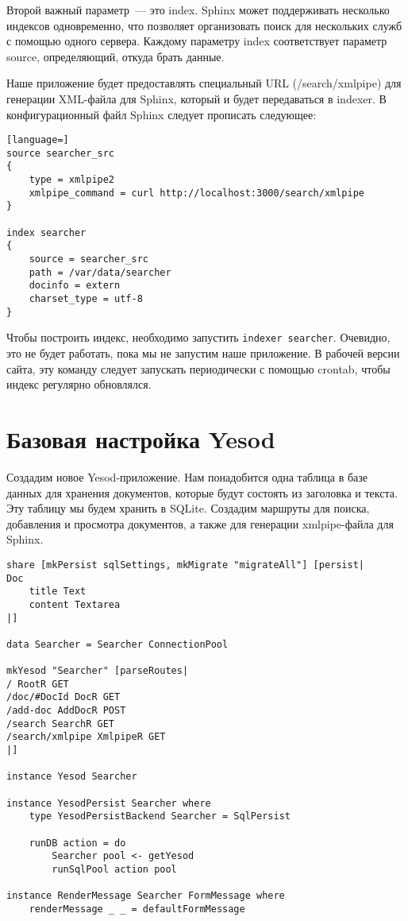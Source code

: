 Второй важный параметр~--- это index. Sphinx может поддерживать несколько индексов одновременно, что позволяет организовать поиск для нескольких служб с помощью одного сервера. Каждому параметру index соответствует параметр source, определяющий, откуда брать данные.

Наше приложение будет предоставлять специальный URL (/search/xmlpipe) для генерации XML-файла для Sphinx, который и будет передаваться в indexer. В конфигурационный файл Sphinx следует прописать следующее:
\begin{lstlisting}[language=]
source searcher_src
{
    type = xmlpipe2
    xmlpipe_command = curl http://localhost:3000/search/xmlpipe
}

index searcher
{
    source = searcher_src
    path = /var/data/searcher
    docinfo = extern
    charset_type = utf-8
}
\end{lstlisting}

Чтобы построить индекс, необходимо запустить \lstinline!indexer searcher!. Очевидно, это не будет работать, пока мы не запустим наше приложение. В рабочей версии сайта, эту команду следует запускать периодически с помощью crontab, чтобы индекс регулярно обновлялся.

\section{Базовая настройка Yesod}
Создадим новое Yesod-приложение. Нам понадобится одна таблица в базе данных для хранения документов, которые будут состоять из заголовка и текста. Эту таблицу мы будем хранить в SQLite. Создадим маршруты для поиска, добавления и просмотра документов, а также для генерации xmlpipe-файла для Sphinx.
\begin{lstlisting}
share [mkPersist sqlSettings, mkMigrate "migrateAll"] [persist|
Doc
    title Text
    content Textarea
|]

data Searcher = Searcher ConnectionPool

mkYesod "Searcher" [parseRoutes|
/ RootR GET
/doc/#DocId DocR GET
/add-doc AddDocR POST
/search SearchR GET
/search/xmlpipe XmlpipeR GET
|]

instance Yesod Searcher

instance YesodPersist Searcher where
    type YesodPersistBackend Searcher = SqlPersist

    runDB action = do
        Searcher pool <- getYesod
        runSqlPool action pool

instance RenderMessage Searcher FormMessage where
    renderMessage _ _ = defaultFormMessage
\end{lstlisting}

